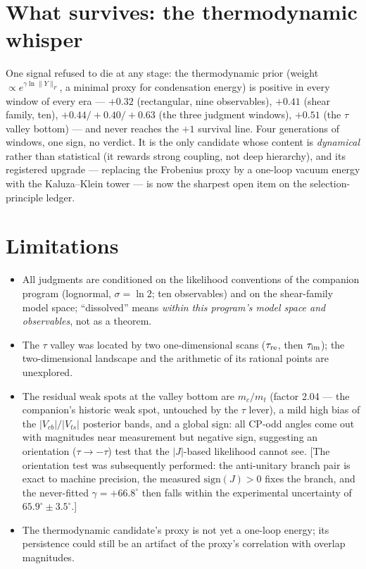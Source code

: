 \documentclass[aps,prd,preprint,nofootinbib]{revtex4-2}
\begin{document}
\section{What survives: the thermodynamic whisper}

One signal refused to die at any stage: the thermodynamic prior (weight
$\propto e^{\gamma\ln\|Y\|_F}$, a minimal proxy for condensation energy) is
positive in every window of every era --- $+0.32$ (rectangular, nine
observables), $+0.41$ (shear family, ten), $+0.44/+0.40/+0.63$ (the three
judgment windows), $+0.51$ (the $\tau$ valley bottom) --- and never reaches the
$+1$ survival line. Four generations of windows, one sign, no verdict. It is
the only candidate whose content is \emph{dynamical} rather than statistical
(it rewards strong coupling, not deep hierarchy), and its registered upgrade
--- replacing the Frobenius proxy by a one-loop vacuum energy with the
Kaluza--Klein tower --- is now the sharpest open item on the
selection-principle ledger.

\section{Limitations}

\begin{itemize}
\item All judgments are conditioned on the likelihood conventions of the
      companion program (lognormal, $\sigma=\ln 2$; ten observables) and on the
      shear-family model space; ``dissolved'' means \emph{within this program's
      model space and observables}, not as a theorem.
\item The $\tau$ valley was located by two one-dimensional scans
      ($\tau_{\rm re}$, then $\tau_{\rm im}$); the two-dimensional landscape
      and the arithmetic of its rational points are unexplored.
\item The residual weak spots at the valley bottom are $m_c/m_t$ (factor 2.04
      --- the companion's historic weak spot, untouched by the $\tau$ lever), a
      mild high bias of the $|V_{cb}|/|V_{ts}|$ posterior bands, and a global
      sign: all CP-odd angles come out with magnitudes near measurement but
      negative sign, suggesting an orientation ($\tau\to-\tau$) test that the
      $|J|$-based likelihood cannot see. [The orientation test was subsequently
      performed: the anti-unitary branch pair is exact to machine precision,
      the measured $\mathrm{sign}(J)>0$ fixes the branch, and the never-fitted
      $\gamma=+66.8^\circ$ then falls within the experimental uncertainty of
      $65.9^\circ\pm 3.5^\circ$.]
\item The thermodynamic candidate's proxy is not yet a one-loop energy; its
      persistence could still be an artifact of the proxy's correlation with
      overlap magnitudes.
\end{itemize}
\end{document}
